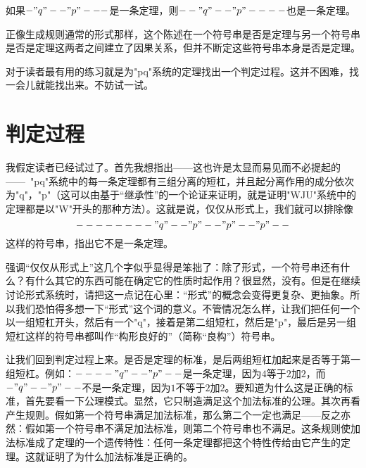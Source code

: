 \begin{block}
如果$-"q"--"p"---$是一条定理，则$--"q"--"p"----$也是一条定理。
\end{block}
正像生成规则通常的形式那样，这个陈述在一个符号串是否是定理与另一个符号串是否是定理这两者之间建立了因果关系，但并不断定这些符号串本身是否是定理。

对于读者最有用的练习就是为"pq"系统的定理找出一个判定过程。这并不困难，找一会儿就能找出来。不妨试一试。

\section{判定过程}

我假定读者已经试过了。首先我想指出——这也许是太显而易见而不必提起的——\ "pq"系统中的每一条定理都有三组分离的短杠，并且起分离作用的成分依次为"q"，"p"（这可以由基于“继承性”的一个论证来证明，就是证明"WJU"系统中的定理都是以"W"开头的那种方法）。这就是说，仅仅从形式上，我们就可以排除像
\[
--------"q"--"p"--"p"--"p"--
\]
这样的符号串，指出它不是一条定理。

强调“仅仅从形式上”这几个字似乎显得是笨拙了：除了形式，一个符号串还有什么？有什么其它的东西可能在确定它的性质时起作用？很显然，没有。但是在继续讨论形式系统时，请把这一点记在心里：“形式”的概念会变得更复杂、更抽象。所以我们恐怕得多想一下“形式”这个词的意义。不管情况怎么样，让我们把任何一个以一组短杠开头，然后有一个"q"，接着是第二组短杠，然后是"p"，最后是另一组短杠这样的符号串都叫作“构形良好的”（简称“良构”）符号串。

让我们回到判定过程上来。是否是定理的标准，是后两组短杠加起来是否等于第一组短杠。例如：$----"q"--"p"--$是一条定理，因为$4$等于$2$加$2$，而$-"q"--"p"--$不是一条定理，因为$1$不等于$2$加$2$。要知道为什么这是正确的标准，首先要看一下公理模式。显然，它只制造满足这个加法标准的公理。其次再看产生规则。假如第一个符号串满足加法标准，那么第二个一定也满足——反之亦然：假如第一个符号串不满足加法标准，则第二个符号串也不满足。这条规则使加法标准成了定理的一个遗传特性：任何一条定理都把这个特性传给由它产生的定理。这就证明了为什么加法标准是正确的。

